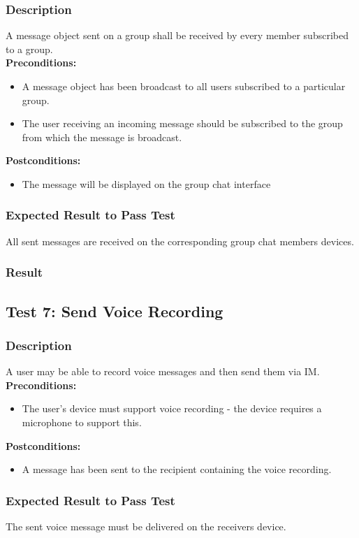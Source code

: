 \documentclass[11pt]{article}
\begin{document}
\subsubsection{Description}
A message object sent on a group shall be received
by every member subscribed to a group.\\
\textbf{Preconditions:} 
\begin{itemize}
\item A message object has been broadcast to all users subscribed to a particular group.
\item The user receiving an incoming message should be subscribed to the
group from which the message is broadcast.
\end{itemize}
\textbf{Postconditions:}
\begin{itemize}
\item The message will be displayed on the group chat interface
\end{itemize}
\subsubsection{Expected Result to Pass Test}
All sent messages are received on the corresponding group chat members devices.
\subsubsection{Result}

\subsection{Test 7: Send Voice Recording}
\subsubsection{Description}
A user may be able to record voice messages and then send them via IM.\\
\textbf{Preconditions:} 
\begin{itemize}
\item The user's device must support voice recording - the device requires a microphone to support this.
\end{itemize}
\textbf{Postconditions:}
\begin{itemize}
\item A message has been sent to the recipient containing the voice recording.
\end{itemize}
\subsubsection{Expected Result to Pass Test}
The sent voice message must be delivered on the receivers device.
\end{document}
